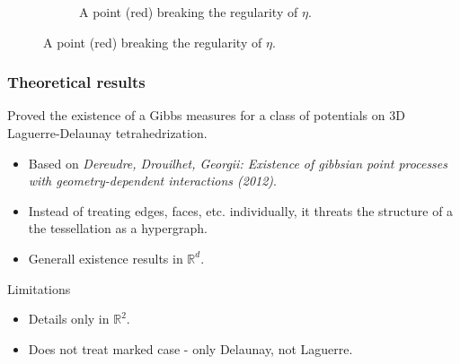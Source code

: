 \documentclass[c, 10pt]{beamer}
\begin{document}
\begin{frame}
\begin{figure}
\begin{minipage}{0.45\textwidth}
\begin{figure}[p]
{
}
\caption{\scriptsize A point (red) breaking the regularity of $\eta$.}
\label{fig:Laguerrecospherical}
\end{figure}
    \end{minipage}
\end{figure}

\vspace{-4mm}






\end{frame}





\begin{frame}\frametitle{Theoretical results}
	Proved the existence of a Gibbs measures for a class of potentials on 3D Laguerre-Delaunay tetrahedrization.

	\vspace{5mm}

	\begin{itemize}
		\item Based on \textit{Dereudre, Drouilhet, Georgii: Existence of gibbsian point processes with geometry-dependent interactions (2012)}.
		\item Instead of treating edges, faces, etc. individually, it threats the structure of a the tessellation as a \alert{hypergraph}.
		\item Generall existence results in $\mathbb R^d$. 
	\end{itemize}

	\vspace{5mm}

	Limitations
	\begin{itemize}
		\item Details only in $\mathbb R^2$.
		\item Does not treat marked case - only Delaunay, not Laguerre.
	\end{itemize}
\end{frame}
\end{document}
